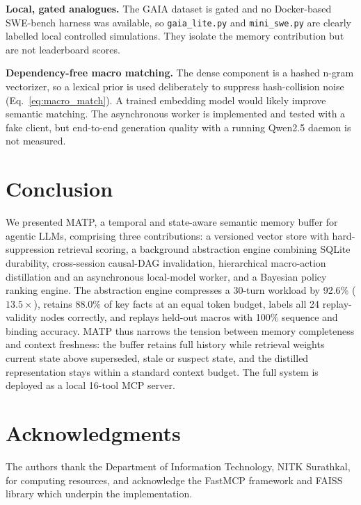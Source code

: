 \documentclass[lettersize,journal]{IEEEtran}
\begin{document}
\textbf{Local, gated analogues.} The GAIA dataset is gated and no Docker-based SWE-bench harness was available, so \texttt{gaia\_lite.py} and \texttt{mini\_swe.py} are clearly labelled local controlled simulations. They isolate the memory contribution but are not leaderboard scores.

\textbf{Dependency-free macro matching.} The dense component is a hashed n-gram vectorizer, so a lexical prior is used deliberately to suppress hash-collision noise (Eq.~\eqref{eq:macro_match}). A trained embedding model would likely improve semantic matching. The asynchronous worker is implemented and tested with a fake client, but end-to-end generation quality with a running Qwen2.5 daemon is not measured.

\section{Conclusion}

We presented MATP, a temporal and state-aware semantic memory buffer for agentic LLMs, comprising three contributions: a versioned vector store with hard-suppression retrieval scoring, a background abstraction engine combining SQLite durability, cross-session causal-DAG invalidation, hierarchical macro-action distillation and an asynchronous local-model worker, and a Bayesian policy ranking engine. The abstraction engine compresses a 30-turn workload by 92.6\% ($13.5\times$), retains 88.0\% of key facts at an equal token budget, labels all 24 replay-validity nodes correctly, and replays held-out macros with 100\% sequence and binding accuracy. MATP thus narrows the tension between memory completeness and context freshness: the buffer retains full history while retrieval weights current state above superseded, stale or suspect state, and the distilled representation stays within a standard context budget. The full system is deployed as a local 16-tool MCP server.

\section*{Acknowledgments}
The authors thank the Department of Information Technology, NITK Surathkal, for computing resources, and acknowledge the FastMCP framework and FAISS library which underpin the implementation.
\end{document}
